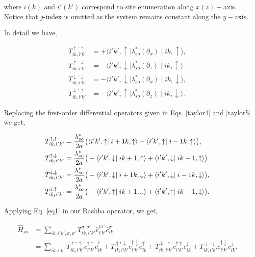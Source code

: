 \documentclass[10pt,prb,showpacs,amssymb,floatfix]{revtex4-1}
\newcommand{\nn}{\nonumber}
\begin{document}
where $i(k)$ and $i'(k')$ correspond to site enumeration along $x(z)-$axis. Notice that $j$-index is omitted as the system remains constant along the $y-$axis. 

In detail we have,

\begin{align}
\label{eq1220xz}
T_{ik,i'k'}^{\uparrow,\uparrow} &= +\langle i'k',\uparrow \mid  \lambda_{so}^*(\partial_x) \mid ik,\uparrow \rangle, \\
\label{eq1221xz}
T_{ik,i'k'}^{\uparrow,\downarrow} &= -\langle i'k',\downarrow \mid \lambda_{so}^*(\partial_z) \mid ik,\uparrow \rangle \\
\label{eq1222xz}
T_{ik,i'k'}^{\downarrow,\downarrow} &= - \langle i'k',\downarrow \mid \lambda_{so}^*(\partial_x) \mid ik,\downarrow \rangle, \\
T_{ik,i'k'}^{\downarrow,\uparrow} &= -\langle i'k',\uparrow \mid  \lambda_{so}^*(\partial_z) \mid ik,\downarrow \rangle.
\label{eq122xz}
\end{align}

Replacing the first-order differential operators given in Eqs. \eqref{taylor4}  and \eqref{taylor5} we get,

\begin{align}
\label{eq1220xz2}
T_{ik,i'k'}^{\uparrow,\uparrow} &= \frac{\lambda_{so}^*}{2a}  \big{(}\langle i'k',\uparrow \mid i+1k,\uparrow \rangle - \langle i'k',\uparrow \mid i-1k,\uparrow \rangle\big{)}, \\
\label{eq1221xz2}
T_{ik,i'k'}^{\uparrow,\downarrow} &= \frac{\lambda_{so}^*}{2a} \big{(} -\langle i'k',\downarrow \mid ik+1,\uparrow \rangle +\langle i'k',\downarrow \mid ik-1,\uparrow \rangle  \big{)}\\
\label{eq1222xz2}
T_{ik,i'k'}^{\downarrow,\downarrow} &= \frac{\lambda_{so}^*}{2a} \big{(} - \langle i'k',\downarrow  \mid i+1k,\downarrow \rangle + \langle i'k',\downarrow \mid i-1k,\downarrow \rangle \big{)}, \\
T_{ik,i'k'}^{\downarrow,\uparrow} &= \frac{\lambda_{so}^*}{2a} \big{(} -\langle i'k',\uparrow \mid ik+1,\downarrow \rangle +  \langle i'k',\uparrow \mid ik-1,\downarrow \rangle \big{)}.
\label{eq122xz2}
\end{align}

Applying Eq. \eqref{eq1} in our Rashba operator, we get,

\begin{align}
\hat H_{so} &= \sum_{ik,i'k',\sigma,\sigma'} T_{ik,i'k'}^{\sigma,\sigma'} \hat{c}_{i'k'}^{\dagger \sigma'} \hat{c}_{ik}^\sigma \nn\\
&= \sum_{ik,i'k'} T_{ik,i'k'}^{\uparrow,\uparrow} c_{i'k'}^{\dagger \uparrow} c_{ik}^\uparrow +  T_{ik,i'k'}^{\uparrow,\downarrow} c_{i'k'}^{\dagger \downarrow} c_{ik}^\uparrow + T_{ik,i'k'}^{\downarrow,\uparrow} c_{i'k'}^{\dagger \uparrow} c_{ik}^\downarrow + T_{ik,i'k'}^{\downarrow,\downarrow} c_{i'k'}^{\dagger \downarrow} c_{ik}^\downarrow.
\label{lastxz}
\end{align}
\end{document}
